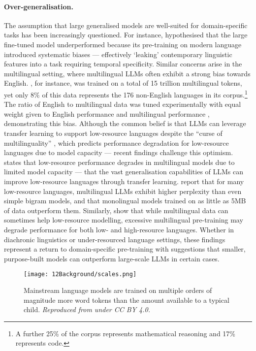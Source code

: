 \paragraph{Over-generalisation.} The assumption that large generalised models are well-suited for domain-specific tasks has been increasingly questioned. For instance, \citet{fittschen2025pretraininglanguagemodelsdiachronic} hypothesised that the large fine-tuned model underperformed because its pre-training on modern language introduced systematic biases --- effectively `leaking' contemporary linguistic features into a task requiring temporal specificity. Similar concerns arise in the multilingual setting, where multilingual LLMs often exhibit a strong bias towards English. , for instance, was trained on a total of 15 trillion multilingual tokens, yet only 8\% of this data represents the 176 non-English languages in its corpus.\footnote{A further 25\% of the corpus represents mathematical reasoning and 17\% represents code.} The ratio of English to multilingual data was tuned experimentally with equal weight given to English performance and multilingual performance \citep{grattafiori2024llama}, demonstrating this bias. Although the common belief is that LLMs can leverage transfer learning to support low-resource languages despite the ``curse of multilinguality'' \citep{conneau2020unsupervised}, which predicts performance degradation for low-resource languages due to model capacity --- recent findings challenge this optimism. states that low-resource performance degrades in multilingual models due to limited model capacity --- that the vast generalisation capabilities of LLMs can improve low-resource languages through transfer learning. \citet{chang2024goldfish} report that for many low-resource languages, multilingual LLMs exhibit higher perplexity than even simple bigram models, and that monolingual models trained on as little as 5MB of data outperform them. Similarly, \citet{chang2024multilinguality} show that while multilingual data can sometimes help low-resource modelling, excessive multilingual pre-training may degrade performance for both low- and high-resource languages. Whether in diachronic linguistics or under-resourced language settings, these findings represent a return to domain-specific pre-training with suggestions that smaller, purpose-built models can outperform large-scale LLMs in certain cases.

\begin{figure}
    \centering
    \texttt{[image: 12Background/scales.png]}
    \caption{Mainstream language models are trained on multiple orders of magnitude more word tokens than the amount available to a typical child. \emph{Reproduced from \citet{wilcox2025} under CC BY 4.0.}}
    \label{fig:12-scales}
\end{figure}

